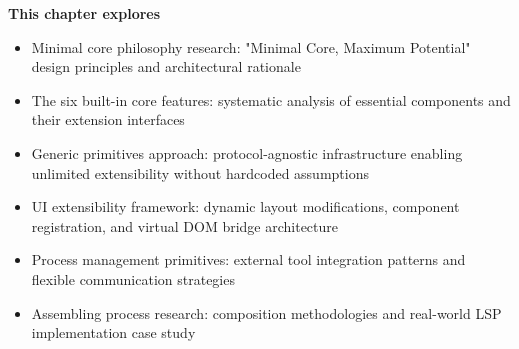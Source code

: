 \begin{tcolorbox}[
    enhanced,
    colback=white,
    colframe=brandPrimary!40,
    boxrule=1pt,
    arc=12pt,
    drop shadow={brandPrimary!20},
    left=1.5cm,
    right=1.5cm,
    top=1.2cm,
    bottom=1.2cm,
    before upper={\parindent0pt}
]
\begin{center}
{\Large\textbf{\textcolor{brandPrimary}{This chapter explores}}}
\end{center}

\vspace{0.8cm}

\begin{itemize}[leftmargin=1.2cm, itemsep=0.4cm, label={\textcolor{brandAccent}{$\triangleright$}}]
    \item {\large Minimal core philosophy research: "Minimal Core, Maximum Potential" design principles and architectural rationale}
    \item {\large The six built-in core features: systematic analysis of essential components and their extension interfaces}
    \item {\large Generic primitives approach: protocol-agnostic infrastructure enabling unlimited extensibility without hardcoded assumptions}
    \item {\large UI extensibility framework: dynamic layout modifications, component registration, and virtual DOM bridge architecture}
    \item {\large Process management primitives: external tool integration patterns and flexible communication strategies}
    \item {\large Assembling process research: composition methodologies and real-world LSP implementation case study}
\end{itemize}
\end{tcolorbox}

\clearpage
